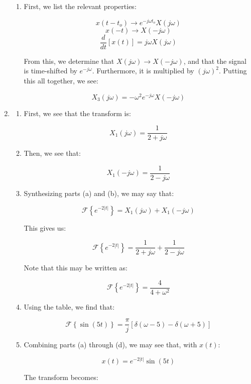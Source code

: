 \begin{enumerate}
\begin{enumerate}
      \item First, we list the relevant properties:

        $$x(t-t_o)\to e^{-j\omega t_o}X(j\omega)$$
        $$x(-t)\to X(-j\omega)$$
        $$\frac{d}{dt}[x(t)]=j\omega X(j\omega)$$

        From this, we determine that $X(j\omega)\to X(-j\omega)$, and that the signal is time-shifted by $e^{-j\omega}$. Furthermore, it is multiplied by $(j\omega)^2$. Putting this all together, we see:

        $$\boxed{X_3(j\omega)=-\omega^2e^{-j\omega}X(-j\omega)}$$

    \end{enumerate}

  \item

    \begin{enumerate}

      \item First, we see that the transform is:

        $$\boxed{X_1(j\omega)=\frac{1}{2+j\omega}}$$

      \item Then, we see that:

        $$\boxed{X_1(-j\omega)=\frac{1}{2-j\omega}}$$

      \item Synthesizing parts (a) and (b), we may say that:

        $$\mathcal{F}\left\{ e^{-2|t|} \right\}=X_1(j\omega)+X_1(-j\omega)$$

        This gives us:

        $$\boxed{\mathcal{F}\left\{ e^{-2|t|} \right\}=\frac{1}{2+j\omega}+\frac{1}{2-j\omega}}$$

        Note that this may be written as:

        $$\boxed{\mathcal{F}\left\{ e^{-2|t|} \right\}=\frac{4}{4+\omega^2}}$$

      \item Using the table, we find that:

        $$\boxed{\mathcal{F}\left\{ \sin(5t) \right\}=\frac{\pi}{j}\left[ \delta(\omega-5)-\delta(\omega+5) \right]}$$

      \item Combining parts (a) through (d), we may see that, with $x(t)$:

        $$x(t)=e^{-2|t|}\sin(5t)$$

        The transform becomes:


\end{enumerate}
\end{enumerate}
